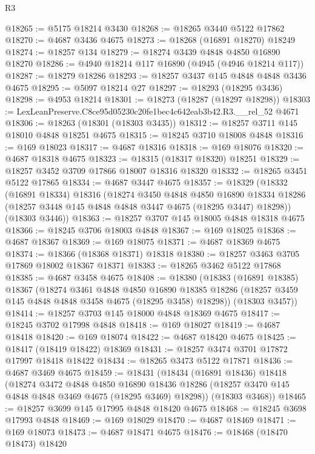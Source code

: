 \begin{lexlean}{R3}
\begin{coremodule}
@18265 := @5175 @18214 @3430
@18268 := @18265 @3440 @5122 @17862
@18270 := @4687 @3436 @4675
@18273 := @18268 (@16891 @18270) @18249
@18274 := @18257 @134
@18279 := @18274 @3439 @4848 @4850 @16890 @18270
@18286 := @4940 @18214 @117 @16890 (@4945 (@4946 @18214 @117))
@18287 := @18279 @18286
@18293 := @18257 @3437 @145 @4848 @4848 @3436 @4675
@18295 := @5097 @18214 @27
@18297 := @18293 (@18295 @3436)
@18298 := @4953 @18214
@18301 := @18273 (@18287 (@18297 @18298))
@18303 := LexLeanPreserve.C8ce95d05230c20fe1bec4c642eab3b42.R3.__rel_52 @4671
@18306 := @18263 (@18301 (@18303 @3435))
@18312 := @18257 @3711 @145 @18010 @4848 @18251 @4675
@18315 := @18245 @3710 @18008 @4848
@18316 := @169 @18023
@18317 := @4687 @18316
@18318 := @169 @18076
@18320 := @4687 @18318 @4675
@18323 := @18315 (@18317 @18320) @18251
@18329 := @18257 @3452 @3709 @17866 @18007 @18316 @18320
@18332 := @18265 @3451 @5122 @17865
@18334 := @4687 @3447 @4675
@18357 := @18329
    (@18332
      (@16891 @18334)
      @18316
      (@18274
        @3450
        @4848
        @4850
        @16890
        @18334
        @18286
        (@18257 @3448 @145 @4848 @4848 @3447 @4675 (@18295 @3447) @18298))
      (@18303 @3446))
@18363 := @18257 @3707 @145 @18005 @4848 @18318 @4675
@18366 := @18245 @3706 @18003 @4848
@18367 := @169 @18025
@18368 := @4687 @18367
@18369 := @169 @18075
@18371 := @4687 @18369 @4675
@18374 := @18366 (@18368 @18371) @18318
@18380 := @18257 @3463 @3705 @17869 @18002 @18367 @18371
@18383 := @18265 @3462 @5122 @17868
@18385 := @4687 @3458 @4675
@18408 := @18380
    (@18383
      (@16891 @18385)
      @18367
      (@18274
        @3461
        @4848
        @4850
        @16890
        @18385
        @18286
        (@18257 @3459 @145 @4848 @4848 @3458 @4675 (@18295 @3458) @18298))
      (@18303 @3457))
@18414 := @18257 @3703 @145 @18000 @4848 @18369 @4675
@18417 := @18245 @3702 @17998 @4848
@18418 := @169 @18027
@18419 := @4687 @18418
@18420 := @169 @18074
@18422 := @4687 @18420 @4675
@18425 := @18417 (@18419 @18422) @18369
@18431 := @18257 @3474 @3701 @17872 @17997 @18418 @18422
@18434 := @18265 @3473 @5122 @17871
@18436 := @4687 @3469 @4675
@18459 := @18431
    (@18434
      (@16891 @18436)
      @18418
      (@18274
        @3472
        @4848
        @4850
        @16890
        @18436
        @18286
        (@18257 @3470 @145 @4848 @4848 @3469 @4675 (@18295 @3469) @18298))
      (@18303 @3468))
@18465 := @18257 @3699 @145 @17995 @4848 @18420 @4675
@18468 := @18245 @3698 @17993 @4848
@18469 := @169 @18029
@18470 := @4687 @18469
@18471 := @169 @18073
@18473 := @4687 @18471 @4675
@18476 := @18468 (@18470 @18473) @18420

\end{coremodule}
\end{lexlean}
